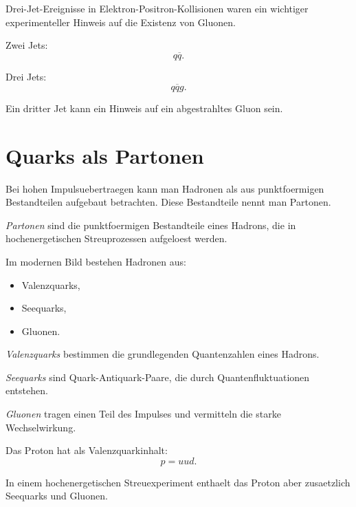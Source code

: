 \begin{notebox}
Drei-Jet-Ereignisse in Elektron-Positron-Kollisionen waren ein wichtiger
experimenteller Hinweis auf die Existenz von Gluonen.
\end{notebox}

\begin{examtipbox}
Zwei Jets:
\[
    q\overline{q}.
\]

Drei Jets:
\[
    q\overline{q}g.
\]

Ein dritter Jet kann ein Hinweis auf ein abgestrahltes Gluon sein.
\end{examtipbox}

\section{Quarks als Partonen}

Bei hohen Impulsuebertraegen kann man Hadronen als aus punktfoermigen Bestandteilen
aufgebaut betrachten.
Diese Bestandteile nennt man Partonen.

\begin{definitionbox}
\emph{Partonen} sind die punktfoermigen Bestandteile eines Hadrons, die in
hochenergetischen Streuprozessen aufgeloest werden.
\end{definitionbox}

\begin{conceptbox}
Im modernen Bild bestehen Hadronen aus:
\begin{itemize}
    \item Valenzquarks,
    \item Seequarks,
    \item Gluonen.
\end{itemize}
\end{conceptbox}

\begin{definitionbox}
\emph{Valenzquarks} bestimmen die grundlegenden Quantenzahlen eines Hadrons.

\emph{Seequarks} sind Quark-Antiquark-Paare, die durch Quantenfluktuationen entstehen.

\emph{Gluonen} tragen einen Teil des Impulses und vermitteln die starke Wechselwirkung.
\end{definitionbox}

\begin{examplebox}
Das Proton hat als Valenzquarkinhalt:
\[
    p=uud.
\]

In einem hochenergetischen Streuexperiment enthaelt das Proton aber zusaetzlich
Seequarks und Gluonen.
\end{examplebox}

